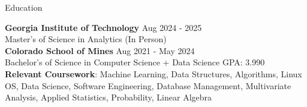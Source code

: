 \documentclass{resume} %
\begin{document}
\vspace{-10pt}

\begin{rSection}{Education}

{\bf Georgia Institute of Technology} \hfill {Aug 2024 - 2025}\\
Master's of Science in Analytics (In Person) \\
{\bf Colorado School of Mines} \hfill {Aug 2021 - May 2024}\\
Bachelor's of Science in Computer Science + Data Science \hfill {GPA: 3.990}\\
\textbf{Relevant Coursework}: Machine Learning, Data Structures, Algorithms, Linux OS, Data Science, Software Engineering, Database Management, Multivariate Analysis, Applied Statistics, Probability, Linear Algebra



\end{rSection}
\vspace{-6pt}
\end{document}
